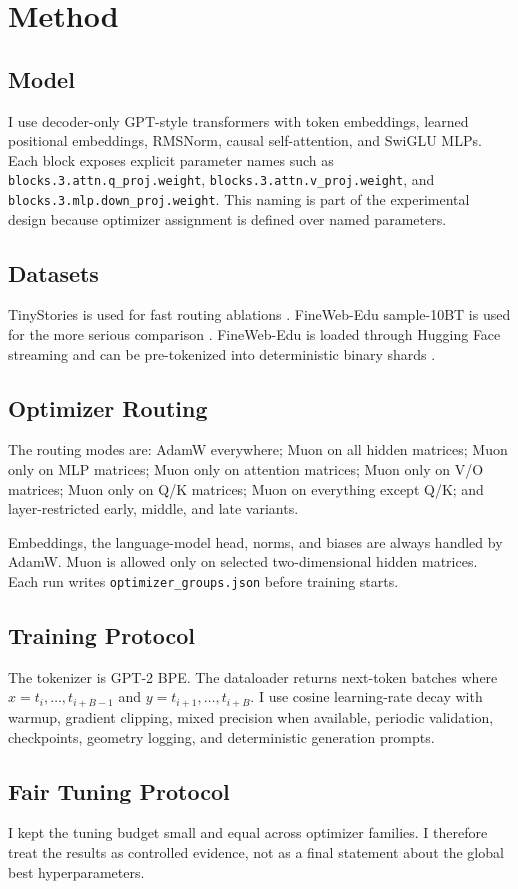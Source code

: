 \section{Method}

\subsection{Model}
I use decoder-only GPT-style transformers with token embeddings, learned positional embeddings, RMSNorm, causal self-attention, and SwiGLU MLPs. Each block exposes explicit parameter names such as \texttt{blocks.3.attn.q\_proj.weight}, \texttt{blocks.3.attn.v\_proj.weight}, and \texttt{blocks.3.mlp.down\_proj.weight}. This naming is part of the experimental design because optimizer assignment is defined over named parameters.

\subsection{Datasets}
TinyStories is used for fast routing ablations \cite{tinystories}. FineWeb-Edu sample-10BT is used for the more serious comparison \cite{fineweb}. FineWeb-Edu is loaded through Hugging Face streaming and can be pre-tokenized into deterministic binary shards \cite{hf_streaming}.

\subsection{Optimizer Routing}
The routing modes are: AdamW everywhere; Muon on all hidden matrices; Muon only on MLP matrices; Muon only on attention matrices; Muon only on V/O matrices; Muon only on Q/K matrices; Muon on everything except Q/K; and layer-restricted early, middle, and late variants.

Embeddings, the language-model head, norms, and biases are always handled by AdamW. Muon is allowed only on selected two-dimensional hidden matrices. Each run writes \texttt{optimizer\_groups.json} before training starts.

\subsection{Training Protocol}
The tokenizer is GPT-2 BPE. The dataloader returns next-token batches where \(x=t_i,\ldots,t_{i+B-1}\) and \(y=t_{i+1},\ldots,t_{i+B}\). I use cosine learning-rate decay with warmup, gradient clipping, mixed precision when available, periodic validation, checkpoints, geometry logging, and deterministic generation prompts.

\subsection{Fair Tuning Protocol}
I kept the tuning budget small and equal across optimizer families. I therefore treat the results as controlled evidence, not as a final statement about the global best hyperparameters.

